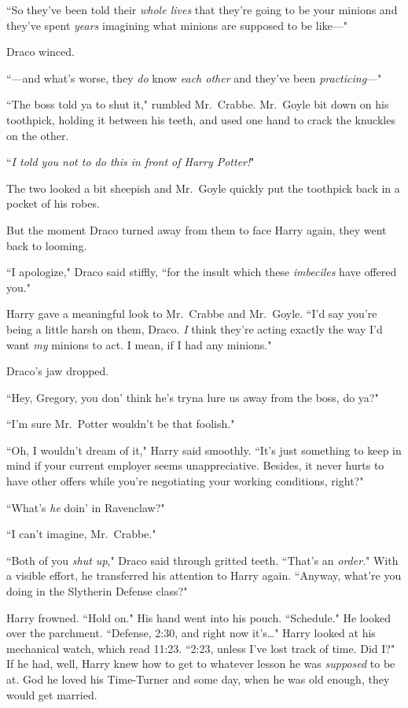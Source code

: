 ``So they've been told their \emph{whole lives} that they're going to be your minions and they've spent \emph{years} imagining what minions are supposed to be like—"

Draco winced.

``—and what's worse, they \emph{do} know \emph{each other} and they've been \emph{practicing}—"

``The boss told ya to shut it," rumbled Mr.~Crabbe. Mr.~Goyle bit down on his toothpick, holding it between his teeth, and used one hand to crack the knuckles on the other.

``\emph{I told you not to do this in front of Harry Potter!}"

The two looked a bit sheepish and Mr.~Goyle quickly put the toothpick back in a pocket of his robes.

But the moment Draco turned away from them to face Harry again, they went back to looming.

``I apologize," Draco said stiffly, ``for the insult which these \emph{imbeciles} have offered you."

Harry gave a meaningful look to Mr.~Crabbe and Mr.~Goyle. ``I'd say you're being a little harsh on them, Draco. \emph{I} think they're acting exactly the way I'd want \emph{my} minions to act. I mean, if I had any minions."

Draco's jaw dropped.

``Hey, Gregory, you don' think he's tryna lure us away from the boss, do ya?"

``I'm sure Mr.~Potter wouldn't be that foolish."

``Oh, I wouldn't dream of it," Harry said smoothly. ``It's just something to keep in mind if your current employer seems unappreciative. Besides, it never hurts to have other offers while you're negotiating your working conditions, right?"

``What's \emph{he} doin' in Ravenclaw?"

``I can't imagine, Mr.~Crabbe."

``Both of you \emph{shut up}," Draco said through gritted teeth. ``That's an \emph{order}." With a visible effort, he transferred his attention to Harry again. ``Anyway, what're you doing in the Slytherin Defense class?"

Harry frowned. ``Hold on." His hand went into his pouch. ``Schedule." He looked over the parchment. ``Defense, 2:30\pm, and right now it's{\ldots}" Harry looked at his mechanical watch, which read 11:23. ``2:23, unless I've lost track of time. Did I?" If he had, well, Harry knew how to get to whatever lesson he was \emph{supposed} to be at. God he loved his Time-Turner and some day, when he was old enough, they would get married.

